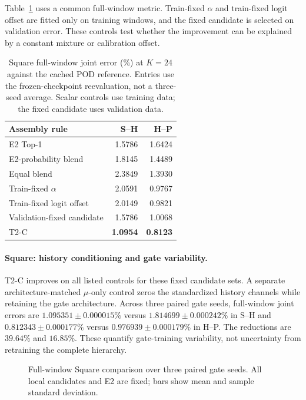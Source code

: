 Table~\ref{tab:routing_fusion} uses a common full-window metric.
Train-fixed $\alpha$ and train-fixed logit offset are fitted only
on training windows, and the fixed candidate is selected on
validation error. These controls test whether the improvement
can be explained by a constant mixture or calibration offset.

\begin{table}[H]
\centering
\small
\caption{Square full-window joint error (\%) at $K=24$ against the
cached POD reference. Entries use the frozen-checkpoint reevaluation,
not a three-seed average. Scalar controls use training data;
the fixed candidate uses validation data.}
\label{tab:routing_fusion}
\begin{tabular}{@{}lrr@{}}
\toprule
Assembly rule & S--H & H--P\\
\midrule
E2 Top-1 & 1.5786 & 1.6424\\
E2-probability blend & 1.8145 & 1.4489\\
Equal blend & 2.3849 & 1.3930\\
Train-fixed $\alpha$ & 2.0591 & 0.9767\\
Train-fixed logit offset & 2.0149 & 0.9821\\
Validation-fixed candidate & 1.5786 & 1.0068\\
T2-C & \textbf{1.0954} & \textbf{0.8123}\\
\bottomrule
\end{tabular}
\end{table}

\paragraph{Square: history conditioning and gate variability.}
T2-C improves on all listed controls for these fixed candidate
sets. A separate architecture-matched $\mu$-only control zeros the
standardized history channels while retaining the gate architecture.
Across three paired gate seeds, full-window joint errors are
$1.095351\pm0.000015\%$ versus $1.814699\pm0.000242\%$
in S--H and $0.812343\pm0.000177\%$ versus
$0.976939\pm0.000179\%$ in H--P.
The reductions are $39.64\%$ and $16.85\%$.
These quantify gate-training variability, not uncertainty from
retraining the complete hierarchy.

\begin{figure}[H]
\centering

\caption{Full-window Square comparison over three paired gate seeds.
All local candidates and E2 are fixed; bars show mean and sample
standard deviation.}
\label{fig:square_overlap}
\end{figure}

